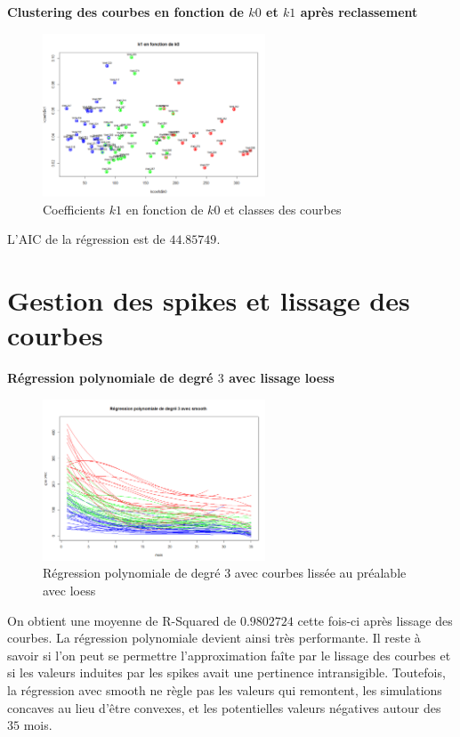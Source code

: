 \documentclass[12pt]{article}
\begin{document}
\textbf{Clustering des courbes en fonction de $k0$ et $k1$ apr\`es reclassement}

\begin{figure}[H]
 \centering %
	\includegraphics[width=250px]{clustering2}
  \caption{\label{fig:k0_k1} Coefficients $k1$ en fonction de $k0$ et classes des courbes}
\end{figure}

L'AIC de la r\'egression est de $44.85749$.


\newpage

\section{Gestion des spikes et lissage des courbes}

\textbf{R\'egression polynomiale de degr\'e $3$ avec lissage loess}

\begin{figure}[H]
 \centering %
	\includegraphics[width=250px]{reg_pol3_smooth_loess}
  \caption{\label{fig:reg_pol3_smooth_loess} R\'egression polynomiale de degr\'e 3 avec courbes liss\'ee au pr\'ealable avec loess}
\end{figure}

On obtient une moyenne de R-Squared de $0.9802724$ cette fois-ci apr\`es lissage des courbes. La r\'egression polynomiale devient ainsi tr\`es performante. Il reste \`a savoir si l'on peut se permettre l'approximation fa\^ite par le lissage des courbes et si les valeurs induites par les spikes avait une pertinence intransigible. 
\newline
Toutefois, la r\'egression avec smooth ne r\`egle pas les valeurs qui remontent, les simulations concaves au lieu d'\^etre convexes, et les potentielles valeurs n\'egatives autour des $35$ mois.
\end{document}
